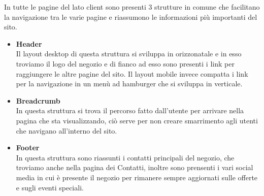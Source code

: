 In tutte le pagine del lato client sono presenti 3 strutture in comune che facilitano la navigazione tra le varie pagine e riassumono le informazioni più importanti del sito.
	\begin{itemize}
		\item \textbf{Header}\\Il layout desktop di questa struttura si sviluppa in orizzonatale e in esso troviamo il logo del negozio e di fianco ad esso sono presenti i link per raggiungere le altre pagine del sito. Il layout mobile invece compatta i link per la navigazione in un menù ad hamburger che si sviluppa in verticale.
		\item \textbf{Breadcrumb}\\In questa struttura si trova il percorso fatto dall'utente per arrivare nella pagina che sta visualizzando, ciò serve per non creare smarrimento agli utenti che navigano all'interno del sito.
		\item \textbf{Footer}\\In questa struttura sono riassunti i contatti principali del negozio, che troviamo anche nella pagina dei Contatti, inoltre sono prensenti i vari social media in cui è presente il negozio per rimanere sempre aggiornati sulle offerte e sugli eventi speciali.
 	\end{itemize}
 		
